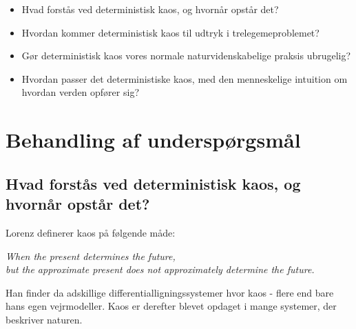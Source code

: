 \documentclass[12pt,a4paper]{article}
\theoremstyle{break}
\theoremstyle{nonumberplain}
\begin{document}
\begin{itemize}
\item Hvad forstås ved deterministisk kaos, og hvornår opstår det?
\item Hvordan kommer deterministisk kaos til udtryk i trelegemeproblemet?
\item Gør deterministisk kaos vores normale naturvidenskabelige praksis ubrugelig?
\item Hvordan passer det deterministiske kaos, med den menneskelige intuition om hvordan verden opfører sig?
\end{itemize}

\section{Behandling af underspørgsmål}

\subsection{Hvad forstås ved deterministisk kaos, og hvornår opstår det?}
Lorenz definerer kaos på følgende måde:
\begin{center}
		\textit{When the present determines the future, \\
		but the approximate present does not approximately determine the future.}
\end{center}
Han finder da adskillige differentialligningssystemer hvor kaos - flere end bare hans egen vejrmodeller.
Kaos er derefter blevet opdaget i mange systemer, der beskriver naturen. 
\end{document}
